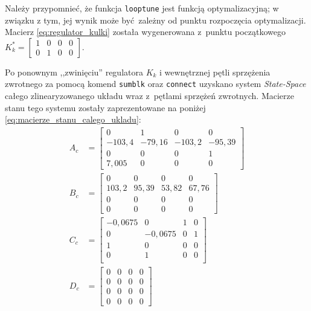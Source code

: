 Należy przypomnieć, że funkcja \texttt{looptune} jest funkcją optymalizacyjną; w związku z tym, jej wynik może być zależny od punktu rozpoczęcia optymalizacji. Macierz \eqref{eq:regulator_kulki} została wygenerowana z~punktu początkowego $K_k^* = \begin{bmatrix}
1 & 0 & 0 & 0 \\ 0 & 1 & 0 & 0
\end{bmatrix}$.

Po ponownym ,,zwinięciu'' regulatora $K_k$ i wewnętrznej pętli sprzężenia zwrotnego za pomocą komend \texttt{sumblk} oraz \texttt{connect} uzyskano system \textit{State-Space} całego zlinearyzowanego układu wraz z~pętlami sprzężeń zwrotnych. Macierze stanu tego systemu zostały zaprezentowane na poniżej \eqref{eq:macierze_stanu_calego_ukladu}:
\begin{align}
    A_c &= \begin{bmatrix}
        0 & 1 & 0 & 0 \\
        -103,4 & -79,16 & -103,2 & -95,39 \\
        0 & 0 & 0 & 1 \\
        7,005 & 0 & 0 & 0
    \end{bmatrix} \nonumber \\
    B_c &= \begin{bmatrix}
        0 & 0 & 0 & 0 \\
        103,2 & 95,39 & 53,82 & 67,76 \\
        0 & 0 & 0 & 0 \\
        0 & 0 & 0 & 0
    \end{bmatrix} \nonumber \\
    C_c &= \begin{bmatrix}
        -0,0675 & 0 & 1 & 0 \\
        0 & -0,0675 & 0 & 1 \\
        1 & 0 & 0 & 0 \\
        0 & 1 & 0 & 0 \\
    \end{bmatrix} \nonumber \\
    D_c &= \begin{bmatrix}
        0 & 0 & 0 & 0 \\
        0 & 0 & 0 & 0 \\
        0 & 0 & 0 & 0 \\
        0 & 0 & 0 & 0
    \end{bmatrix} \label{eq:macierze_stanu_calego_ukladu}
\end{align}

